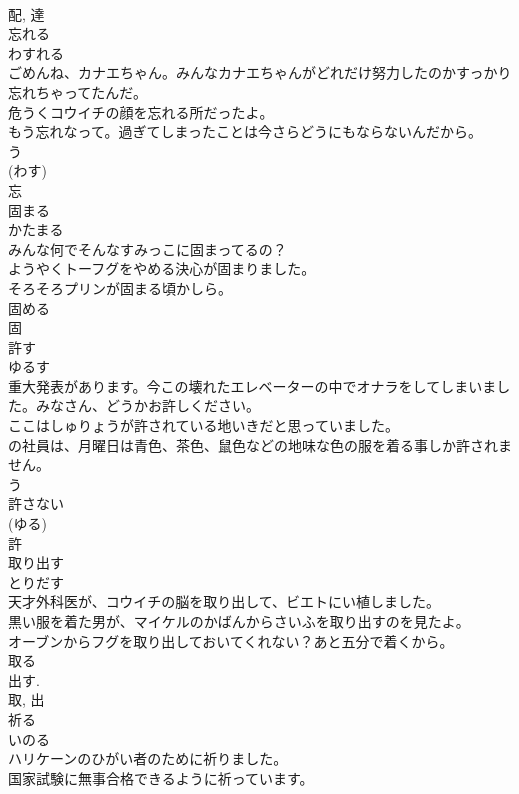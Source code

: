 \documentclass[8pt]{extreport}
\begin{document}
\begin{CJK}{UTF8}{min}
\\	配, 達	
\\	忘れる	
\\	わすれる	
\\	ごめんね、カナエちゃん。みんなカナエちゃんがどれだけ努力したのかすっかり忘れちゃってたんだ。	
\\	危うくコウイチの顔を忘れる所だったよ。	
\\	もう忘れなって。過ぎてしまったことは今さらどうにもならないんだから。	
\\	う 
\\	(わす) 
\\	忘	
\\	固まる	
\\	かたまる	
\\	みんな何でそんなすみっこに固まってるの？	
\\	ようやくトーフグをやめる決心が固まりました。	
\\	そろそろプリンが固まる頃かしら。	
\\	固める 
\\	固	
\\	許す	
\\	ゆるす	
\\	重大発表があります。今この壊れたエレベーターの中でオナラをしてしまいました。みなさん、どうかお許しください。	
\\	ここはしゅりょうが許されている地いきだと思っていました。	
\\	の社員は、月曜日は青色、茶色、鼠色などの地味な色の服を着る事しか許されません。	
\\	う 
\\	許さない 
\\	(ゆる) 
\\	許	
\\	取り出す	
\\	とりだす	
\\	天才外科医が、コウイチの脳を取り出して、ビエトにい植しました。	
\\	黒い服を着た男が、マイケルのかばんからさいふを取り出すのを見たよ。	
\\	オーブンからフグを取り出しておいてくれない？あと五分で着くから。	
\\	取る 
\\	出す. 
\\	取, 出	
\\	祈る	
\\	いのる	
\\	ハリケーンのひがい者のために祈りました。	
\\	国家試験に無事合格できるように祈っています。	

\end{CJK}
\end{document}

